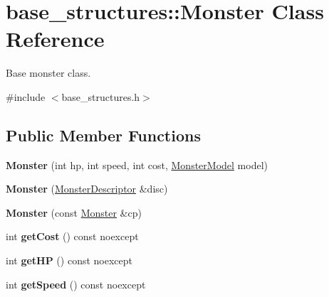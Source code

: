 \hypertarget{classbase__structures_1_1Monster}{}\section{base\+\_\+structures\+:\+:Monster Class Reference}
\label{classbase__structures_1_1Monster}


Base monster class.  




{\ttfamily \#include $<$base\+\_\+structures.\+h$>$}

\subsection*{Public Member Functions}
\begin{DoxyCompactItemize}
\item 
\mbox{\label{classbase__structures_1_1Monster_ad405db6adb794b711bce1fc94c752984}} 
{\bfseries Monster} (int hp, int speed, int cost, \hyperlink{group__monster__interface_ga92d84ad7c1ff9ec724366d3b4d0de044}{Monster\+Model} model)
\item 
\mbox{\label{classbase__structures_1_1Monster_aa6bdfded6716cbf84f63c0982a226272}} 
{\bfseries Monster} (\hyperlink{structbase__structures_1_1MonsterDescriptor}{Monster\+Descriptor} \&disc)
\item 
\mbox{\label{classbase__structures_1_1Monster_a780a9e4ef847a87bb181e96cb5bc7c06}} 
{\bfseries Monster} (const \hyperlink{classbase__structures_1_1Monster}{Monster} \&cp)
\item 
\mbox{\label{classbase__structures_1_1Monster_a57ad200919bba59776a58335c463563a}} 
int {\bfseries get\+Cost} () const noexcept
\item 
\mbox{\label{classbase__structures_1_1Monster_aaa9e7c620c077a351dd90ad1ac9a6f8f}} 
int {\bfseries get\+HP} () const noexcept
\item 
\mbox{\label{classbase__structures_1_1Monster_a6da17ce47679f5d6eb321682d12a2f0b}} 
int {\bfseries get\+Speed} () const noexcept

\end{DoxyCompactItemize}
